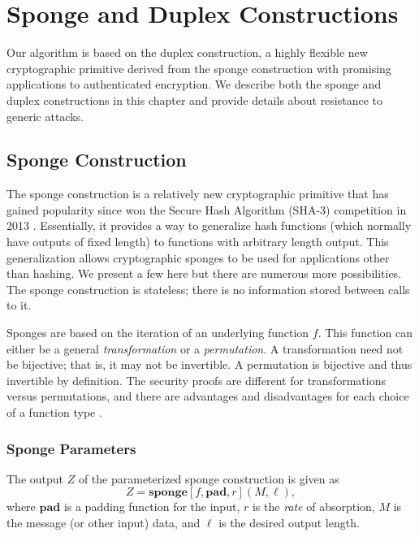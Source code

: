 \chapter{Sponge and Duplex Constructions}
\label{ch:SpongeAndDuplex}
Our algorithm is based on the duplex construction, a highly flexible new cryptographic primitive derived from the sponge construction with promising applications to authenticated encryption.
We describe both the sponge and duplex constructions in this chapter and provide details about resistance to generic attacks.

\section{Sponge Construction}
The sponge construction is a relatively new cryptographic primitive that has gained popularity since \Keccak won the Secure Hash Algorithm (SHA-3) competition in 2013 \cite{Bertoni2011_KeccakReference}\cite{NIST2012_SHA3_Winner}.
Essentially, it provides a way to generalize hash functions (which normally have outputs of fixed length) to functions with arbitrary length output.
This generalization allows cryptographic sponges to be used for applications other than hashing.
We present a few here but there are numerous more possibilities.
The sponge construction is stateless; there is no information stored between calls to it.

Sponges are based on the iteration of an underlying function $f$.
This function can either be a general \emph{transformation} or a \emph{permutation}.
A transformation need not be bijective; that is, it may not be invertible.
A permutation is bijective and thus invertible by definition.
The security proofs are different for transformations versus permutations, and there are advantages and disadvantages for each choice of a function type \cite{Bertoni2011_SpongeFunctions}.

\subsection{Sponge Parameters}
The output $Z$ of the parameterized sponge construction is given as
\begin{equation*}
\label{eq:SpongeOutput}
Z = \mathbf{sponge}[f,\mathbf{pad},r](M,\ell),
\end{equation*}
where $\mathbf{pad}$ is a padding function for the input, $r$ is the \emph{rate} of absorption, $M$ is the message (or other input) data, and $\ell$ is the desired output length.

